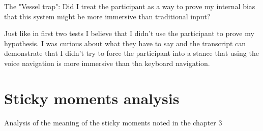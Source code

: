 \begin{QandA}
    \item The "Vessel trap": Did I treat the participant as a way to prove my internal bias that this system might be more immersive than traditional input?

        \begin{answered}
            Just like in first two tests I believe that I didn't use the participant to prove my hypothesis. I was curious about what they have to say and the transcript can demonstrate that I didn't try to force the participant into a stance that using the voice navigation is more immersive than tha keyboard navigation.
        \end{answered}
\end{QandA}

\section{Sticky moments analysis}
Analysis of the meaning of the sticky moments noted in the chapter 3


